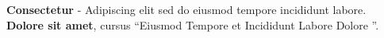 %
%
%

\begin{scholarship}
{\textbf{Consectetur} - Adipiscing elit sed do eiusmod tempore incididunt labore. }
{ \textbf{Dolore sit amet}, cursus \textquotedblleft Eiusmod Tempore et Incididunt Labore Dolore \textquotedblright .}			     
\end{scholarship}
